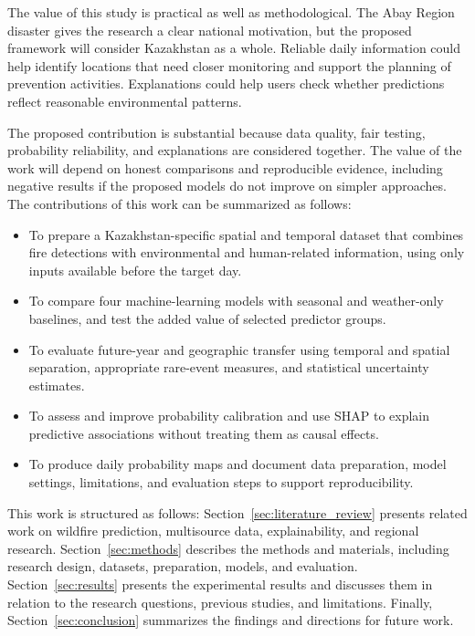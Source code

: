 \documentclass[pdflatex,sn-mathphys-num]{sn-jnl}
\begin{document}
The value of this study is practical as well as methodological. The Abay Region disaster gives the research a clear national motivation, but the proposed framework will consider Kazakhstan as a whole. Reliable daily information could help identify locations that need closer monitoring and support the planning of prevention activities. Explanations could help users check whether predictions reflect reasonable environmental patterns. 

The proposed contribution is substantial because data quality, fair testing, probability reliability, and explanations are considered together. The value of the work will depend on honest comparisons and reproducible evidence, including negative results if the proposed models do not improve on simpler approaches. The contributions of this work can be summarized as follows:
\begin{itemize}
\item To prepare a Kazakhstan-specific spatial and temporal dataset that combines fire detections with environmental and human-related information, using only inputs available before the target day.
\item To compare four machine-learning models with seasonal and weather-only baselines, and test the added value of selected predictor groups.
\item To evaluate future-year and geographic transfer using temporal and spatial separation, appropriate rare-event measures, and statistical uncertainty estimates.
\item To assess and improve probability calibration and use SHAP to explain predictive associations without treating them as causal effects.
\item To produce daily probability maps and document data preparation, model settings, limitations, and evaluation steps to support reproducibility.
\end{itemize}

This work is structured as follows: Section~\ref{sec:literature_review} presents related work on wildfire prediction, multisource data, explainability, and regional research. Section~\ref{sec:methods} describes the methods and materials, including research design, datasets, preparation, models, and evaluation. Section~\ref{sec:results} presents the experimental results and discusses them in relation to the research questions, previous studies, and limitations. Finally, Section~\ref{sec:conclusion} summarizes the findings and directions for future work.
\end{document}
